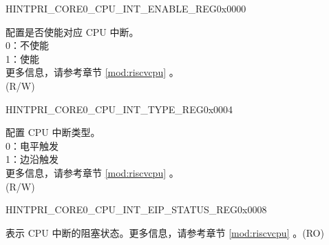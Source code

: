 \begin{register}{H}{INTPRI\_CORE0\_CPU\_INT\_ENABLE\_REG}{0x0000}\label{regdesc:INTPRICORE0CPUINTENABLEREG}
%
\regnewline%
\begin{regdesc}\begin{reglist}
\label{fielddesc:INTPRICORE0CPUINTENABLE}\item [INTPRI\_CORE0\_CPU\_INT\_ENABLE] 配置是否使能对应 CPU 中断。\\
0：不使能\\
1：使能\\
更多信息，请参考章节 \ref{mod:riscvcpu} \textit{}。\\
(R/W)
\end{reglist}\end{regdesc}
\end{register}


\begin{register}{H}{INTPRI\_CORE0\_CPU\_INT\_TYPE\_REG}{0x0004}\label{regdesc:INTPRICORE0CPUINTTYPEREG}
%
\regnewline%
\begin{regdesc}\begin{reglist}
\label{fielddesc:INTPRICORE0CPUINTTYPE}\item [INTPRI\_CORE0\_CPU\_INT\_TYPE] 配置 CPU 中断类型。\\
0：电平触发\\
1：边沿触发\\
更多信息，请参考章节 \ref{mod:riscvcpu} \textit{}。\\
(R/W)
\end{reglist}\end{regdesc}
\end{register}


\begin{register}{H}{INTPRI\_CORE0\_CPU\_INT\_EIP\_STATUS\_REG}{0x0008}\label{regdesc:INTPRICORE0CPUINTEIPSTATUSREG}
%
\regnewline%
\begin{regdesc}\begin{reglist}
\label{fielddesc:INTPRICORE0CPUINTEIPSTATUS}\item [INTPRI\_CORE0\_CPU\_INT\_EIP\_STATUS] 表示 CPU 中断的阻塞状态。更多信息，请参考章节 \ref{mod:riscvcpu} \textit{}。(RO)
\end{reglist}\end{regdesc}
\end{register}


